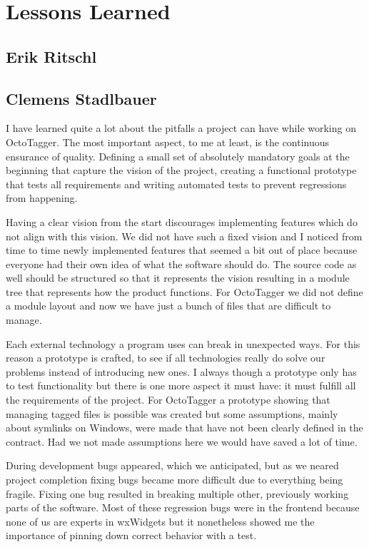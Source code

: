 \section{Lessons Learned}
\def\kapitelautor{}

\subsection{Erik Ritschl}


\subsection{Clemens Stadlbauer}

I have learned quite a lot about the pitfalls a project can have while working
on OctoTagger. The most important aspect, to me at least, is the continuous
ensurance of quality. Defining a small set of absolutely mandatory goals at the
beginning that capture the vision of the project, creating a functional
prototype that tests all requirements and writing automated tests to prevent
regressions from happening.

Having a clear vision from the start discourages implementing features which do
not align with this vision. We did not have such a fixed vision and I noticed
from time to time newly implemented features that seemed a bit out of place
because everyone had their own idea of what the software should do. The source
code as well should be structured so that it represents the vision resulting
in a module tree that represents how the product functions. For OctoTagger we
did not define a module layout and now we have just a bunch of files that are
difficult to manage.

Each external technology a program uses can break in unexpected ways. For this
reason a prototype is crafted, to see if all technologies really do solve our
problems instead of introducing new ones. I always though a prototype only has
to test functionality but there is one more aspect it must have: it must fulfill
all the requirements of the project. For OctoTagger a prototype showing that
managing tagged files is possible was created but some assumptions, mainly about
symlinks on Windows, were made that have not been clearly defined in the
contract. Had we not made assumptions here we would have saved a lot of time.

During development bugs appeared, which we anticipated, but as we neared
project completion fixing bugs became more difficult due to everything being
fragile. Fixing one bug resulted in breaking multiple other, previously working
parts of the software. Most of these regression bugs were in the frontend
because none of us are experts in wxWidgets but it nonetheless showed me the
importance of pinning down correct behavior with a test.

